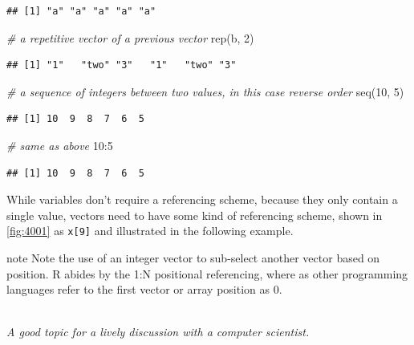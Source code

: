 \documentclass[
]{book}
\newenvironment{Shaded}{\begin{snugshade}}{\end{snugshade}}
\newcommand{\CommentTok}[1]{\textcolor[rgb]{0.56,0.35,0.01}{\textit{#1}}}
\newcommand{\DecValTok}[1]{\textcolor[rgb]{0.00,0.00,0.81}{#1}}
\newcommand{\FunctionTok}[1]{\textcolor[rgb]{0.00,0.00,0.00}{#1}}
\newcommand{\NormalTok}[1]{#1}
\newcommand{\SpecialCharTok}[1]{\textcolor[rgb]{0.00,0.00,0.00}{#1}}
\begin{document}
\begin{verbatim}
## [1] "a" "a" "a" "a" "a"
\end{verbatim}

\begin{Shaded}
\begin{Highlighting}[]
\CommentTok{\# a repetitive vector of a previous vector}
\FunctionTok{rep}\NormalTok{(b, }\DecValTok{2}\NormalTok{)}
\end{Highlighting}
\end{Shaded}

\begin{verbatim}
## [1] "1"   "two" "3"   "1"   "two" "3"
\end{verbatim}

\begin{Shaded}
\begin{Highlighting}[]
\CommentTok{\# a sequence of integers between two values, in this case reverse order}
\FunctionTok{seq}\NormalTok{(}\DecValTok{10}\NormalTok{, }\DecValTok{5}\NormalTok{)}
\end{Highlighting}
\end{Shaded}

\begin{verbatim}
## [1] 10  9  8  7  6  5
\end{verbatim}

\begin{Shaded}
\begin{Highlighting}[]
\CommentTok{\# same as above}
\DecValTok{10}\SpecialCharTok{:}\DecValTok{5}
\end{Highlighting}
\end{Shaded}

\begin{verbatim}
## [1] 10  9  8  7  6  5
\end{verbatim}

While variables don't require a referencing scheme, because they only contain a single value, vectors need to have some kind of referencing scheme, shown in \ref{fig:4001} as \texttt{x{[}9{]}} and illustrated in the following example.

\begin{infobox}{note}
Note the use of an integer vector to sub-select another vector based on position. R abides by the 1:N positional referencing, where as other programming languages refer to the first vector or array position as 0.\\
\strut \\
\emph{A good topic for a lively discussion with a computer scientist.}

\end{infobox}
\end{document}

